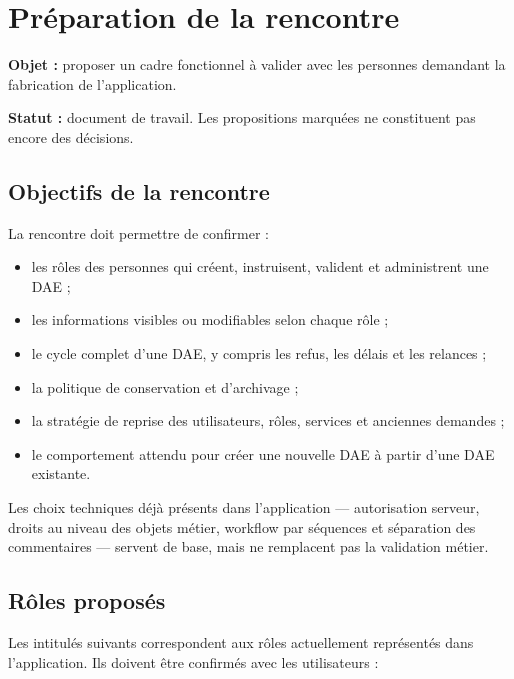 \section{Préparation de la rencontre}

\textbf{Objet :} proposer un cadre fonctionnel à valider avec les personnes demandant la fabrication de l'application.

\textbf{Statut :} document de travail. Les propositions marquées \etatAValider{} ne constituent pas encore des décisions.

\subsection{Objectifs de la rencontre}

La rencontre doit permettre de confirmer :

\begin{itemize}
  \item les rôles des personnes qui créent, instruisent, valident et administrent une DAE ;
  \item les informations visibles ou modifiables selon chaque rôle ;
  \item le cycle complet d'une DAE, y compris les refus, les délais et les relances ;
  \item la politique de conservation et d'archivage ;
  \item la stratégie de reprise des utilisateurs, rôles, services et anciennes demandes ;
  \item le comportement attendu pour créer une nouvelle DAE à partir d'une DAE existante.
\end{itemize}

Les choix techniques déjà présents dans l'application — autorisation serveur, droits au niveau des objets métier, workflow par séquences et séparation des commentaires — servent de base, mais ne remplacent pas la validation métier.

\subsection{Rôles proposés}

Les intitulés suivants correspondent aux rôles actuellement représentés dans l'application. Ils doivent être confirmés avec les utilisateurs :

